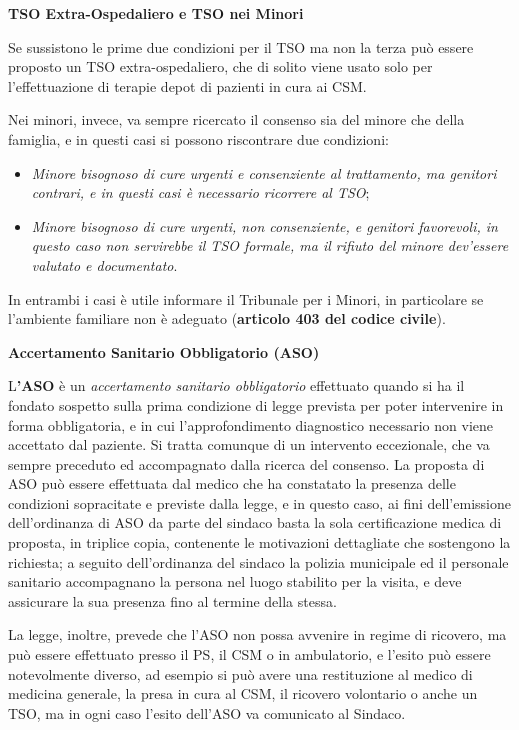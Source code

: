 \documentclass[]{article}
\begin{document}
\textbf{TSO Extra-Ospedaliero e TSO nei Minori}

Se sussistono le prime due condizioni per il TSO ma non la terza può
essere proposto un TSO extra-ospedaliero, che di solito viene usato solo
per l'effettuazione di terapie depot di pazienti in cura ai CSM.

Nei minori, invece, va sempre ricercato il consenso sia del minore che
della famiglia, e in questi casi si possono riscontrare due condizioni:

\begin{itemize}
\item
  \emph{Minore bisognoso di cure urgenti e consenziente al trattamento,
  ma genitori contrari, e in questi casi è necessario ricorrere al TSO};
\item
  \emph{Minore bisognoso di cure urgenti, non consenziente, e genitori
  favorevoli, in questo caso non servirebbe il TSO formale, ma il
  rifiuto del minore dev'essere valutato e documentato}.
\end{itemize}

In entrambi i casi è utile informare il Tribunale per i Minori, in
particolare se l'ambiente familiare non è adeguato (\textbf{articolo 403
del codice civile}).

\textbf{Accertamento Sanitario Obbligatorio (ASO)}

L\textbf{'ASO} è un \emph{accertamento sanitario obbligatorio}
effettuato quando si ha il fondato sospetto sulla prima condizione di
legge prevista per poter intervenire in forma obbligatoria, e in cui
l'approfondimento diagnostico necessario non viene accettato dal
paziente. Si tratta comunque di un intervento eccezionale, che va sempre
preceduto ed accompagnato dalla ricerca del consenso. La proposta di ASO
può essere effettuata dal medico che ha constatato la presenza delle
condizioni sopracitate e previste dalla legge, e in questo caso, ai fini
dell'emissione dell'ordinanza di ASO da parte del sindaco basta la sola
certificazione medica di proposta, in triplice copia, contenente le
motivazioni dettagliate che sostengono la richiesta; a seguito
dell'ordinanza del sindaco la polizia municipale ed il personale
sanitario accompagnano la persona nel luogo stabilito per la visita, e
deve assicurare la sua presenza fino al termine della stessa.

La legge, inoltre, prevede che l'ASO non possa avvenire in regime di
ricovero, ma può essere effettuato presso il PS, il CSM o in
ambulatorio, e l'esito può essere notevolmente diverso, ad esempio si
può avere una restituzione al medico di medicina generale, la presa in
cura al CSM, il ricovero volontario o anche un TSO, ma in ogni caso
l'esito dell'ASO va comunicato al Sindaco.
\end{document}
